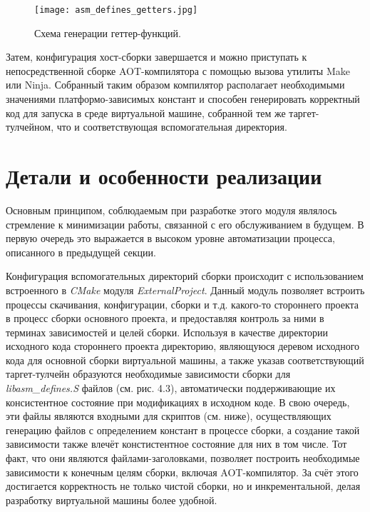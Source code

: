 \begin{figure}[H]
    \centering
    \texttt{[image: asm\_defines\_getters.jpg]}
    \caption{Схема генерации геттер-функций.}
\end{figure}

Затем, конфигурация хост-сборки завершается и можно приступать к непосредственной сборке AOT-компилятора с помощью вызова утилиты Make или Ninja. Собранный таким образом компилятор располагает необходимыми значениями платформо-зависимых констант и способен генерировать корректный код для запуска в среде виртуальной машине, собранной тем же таргет-тулчейном, что и соответствующая вспомогательная директория.

\section{Детали и особенности реализации}
Основным принципом, соблюдаемым при разработке этого модуля являлось стремление к минимизации работы, связанной с его обслуживанием в будущем. В первую очередь это выражается в высоком уровне автоматизации процесса, описанного в предыдущей секции.

\par
Конфигурация вспомогательных директорий сборки происходит с использованием встроенного в \textit{CMake} модуля \textit{ExternalProject}.
Данный модуль позволяет встроить процессы скачивания, конфигурации, сборки и т.д. какого-то стороннего проекта в процесс сборки основного проекта, и предоставляя контроль за ними в терминах зависимостей и целей сборки.
Используя в качестве директории исходного кода стороннего проекта директорию, являющуюся деревом исходного кода для основной сборки виртуальной машины, а также указав соответствующий таргет-тулчейн образуются необходимые зависимости сборки для \textit{libasm\_defines.S} файлов (см. рис. 4.3), автоматически поддерживающие их консистентное состояние при модификациях в исходном коде.
В свою очередь, эти файлы являются входными для скриптов (см. ниже), осуществляющих генерацию файлов с определением констант в процессе сборки, а создание такой зависимости также влечёт констистентное состояние для них в том числе. Тот факт, что они являются файлами-заголовками, позволяет построить необходимые зависимости к конечным целям сборки, включая AOT-компилятор. За счёт этого достигается корректность не только чистой сборки, но и инкрементальной, делая разработку виртуальной машины более удобной.

